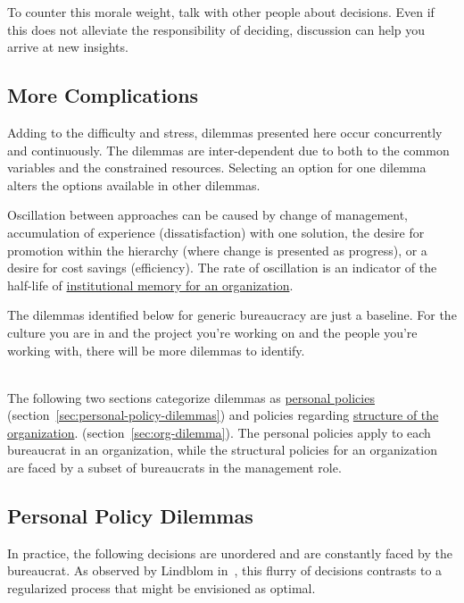 To counter this morale weight, talk with other people about decisions. 
Even if this does not alleviate the responsibility of deciding, discussion can help you arrive at new insights. 

\subsection*{More Complications}
Adding to the difficulty and stress, dilemmas presented here occur concurrently and continuously. The dilemmas are inter-dependent due to both to the common variables and the constrained resources.
Selecting an option for one dilemma alters the options available in other dilemmas.

Oscillation between approaches can be caused by change of management, accumulation of experience (dissatisfaction) with one solution, the desire for promotion within the hierarchy (where change is presented as progress), or a desire for cost savings (efficiency). The rate of oscillation is an indicator of the half-life of \href{https://en.wikipedia.org/wiki/Institutional_memory}{institutional memory for an organization}.  

The dilemmas identified below for generic bureaucracy are just a baseline. For the culture you are in and the project you're working on and the people you're working with, there will be more dilemmas to identify. 

\ \\

The following two sections categorize dilemmas as \hyperref[sec:personal-policy-dilemmas]{personal policies} 
\ifsectionref
(section~\ref{sec:personal-policy-dilemmas}) 
\fi
and policies regarding \hyperref[sec:org-dilemma]{structure of the organization}.
\ifsectionref
(section~\ref{sec:org-dilemma}). 
\fi
The personal policies apply to each bureaucrat in an organization, while the structural policies for an organization are faced by a subset of bureaucrats in the management role. 

\subsection*{Personal Policy Dilemmas \label{sec:personal-policy-dilemmas}}

In practice, the following decisions are unordered and are constantly faced by the bureaucrat. As observed by Lindblom in~\cite{1959_Lindblom}, this flurry of decisions contrasts to a regularized process that might be envisioned as optimal.


